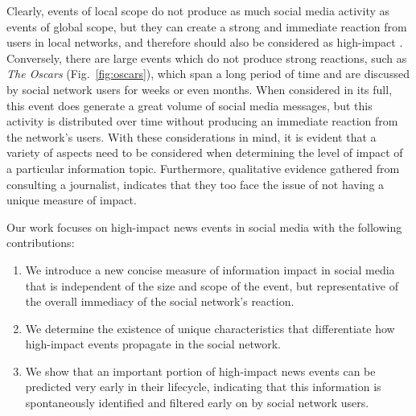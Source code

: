 \documentclass[10pt,letterpaper]{article}
\newcommand{\newtext}[1]{{\leavevmode\color{blue}#1}}
\begin{document}
Clearly, events of local scope do not produce as much social media
activity as events of global scope, but they can create a strong and
immediate reaction from users in local networks, and therefore should
also be considered as high-impact \cite{ReisBOPKA15}. Conversely,
there are large events which do not produce strong reactions, such as
{\em The Oscars} (Fig.~\ref{fig:oscars}), which span a long
period of time and are discussed by social network users for weeks or
even months. When considered in its full, this event does generate a
great volume of social media messages, but this activity is
distributed over time without producing an immediate reaction from the
network's users. With these considerations in mind, it is evident that
a variety of aspects need to be considered when determining the level
of impact of a particular information topic. Furthermore, qualitative
evidence gathered from consulting a journalist, indicates that they
too face the issue of not having a unique measure of impact.



Our work focuses on high-impact news events in social media
with the following contributions:
\begin{enumerate}
\item We introduce a new concise measure of information impact in social
media that is independent of the size and scope of the event, but
representative of the overall immediacy of the social network's reaction.
\item We determine the existence of unique characteristics that
differentiate how high-impact events propagate in the social network.
\item We show that an important portion of high-impact news events can be
predicted very early in their lifecycle, indicating that this information is
spontaneously identified and filtered early on by social network users.
\end{enumerate}

\end{document}
